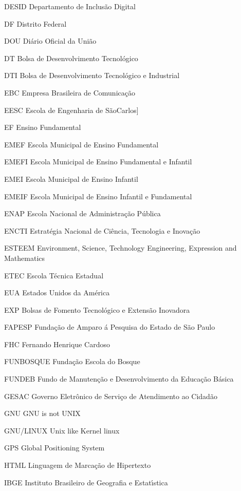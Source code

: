 \begin{siglas}
\item[DESID] Departamento de Inclus\~ao Digital 
\item[DF] Distrito Federal
\item[DOU] Di\'ario Oficial da Uni\~ao
\item[DT] Bolsa de Desenvolvimento Tecnol\'ogico
\item[DTI]  Bolsa de Desenvolvimento Tecnol\'ogico e Industrial
\item[EBC] Empresa Brasileira de Comunica\c{c}\~ao
\item[EESC] Escola de Engenharia de S\~aoCarlos]
\item[EF] Ensino Fundamental
\item[EMEF] Escola Municipal de Ensino Fundamental
\item[EMEFI]  Escola Municipal de Ensino Fundamental e Infantil
\item[EMEI] Escola Municipal de Ensino Infantil
\item[EMEIF] Escola Municipal de Ensino Infantil e Fundamental
\item[ENAP] Escola Nacional de Administra\c{c}\~ao P\'ublica
\item[ENCTI] Estrat\'egia Nacional de Ci\^encia, Tecnologia e Inova\c{c}\~ao
\item[ESTEEM] Environment, Science, Technology Engineering, Expression and Mathematics
\item[ETEC] Escola T\'ecnica Estadual
\item[EUA] Estados Unidos da Am\'erica
\item[EXP] Bolsas de Fomento Tecnol\'ogico e Extens\~ao Inovadora
\item[FAPESP] Funda\c{c}\~ao de Amparo \'a Pesquisa do Estado de S\~ao Paulo
\item[FHC]  Fernando Henrique Cardoso
\item[FUNBOSQUE] Funda\c{c}\~ao Escola do Bosque
\item[FUNDEB] Fundo de Manuten\c{c}\~ao e Desenvolvimento da Educa\c{c}\~ao B\'asica
\item[GESAC] Governo Eletr\^onico de Servi\c{c}o de Atendimento ao Cidad\~ao 
\item[GNU] GNU is not UNIX
\item[GNU/LINUX] Unix like Kernel linux
\item[GPS] Global Positioning System
\item[HTML] Linguagem de  Marca\c{c}\~ao de Hipertexto 
\item[IBGE] Instituto Brasileiro de Geografia e Estat\'{\i}stica

\end{siglas}
